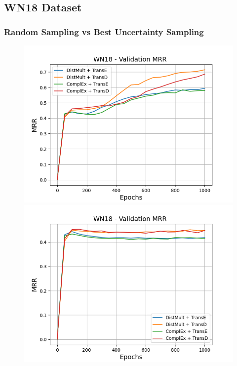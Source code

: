 \subsection{WN18 Dataset}

\subsubsection{Random Sampling vs Best Uncertainty Sampling}
\begin{figure}
    \centering
    \begin{minipage}{.5\textwidth}
      \centering
      \includegraphics[width=0.9\linewidth]{figures/results/gan_train/not_pretrained/random/wn18/random_wn18_mrrs.png}
    \end{minipage}%
    \begin{minipage}{.5\textwidth}
      \centering
      \includegraphics[width=0.9\linewidth]{figures/results/gan_train/not_pretrained/uncertainty/max_distribution/entropy/wn18/uncertainty_wn18_mrrs.png}

\end{minipage}
\end{figure}

